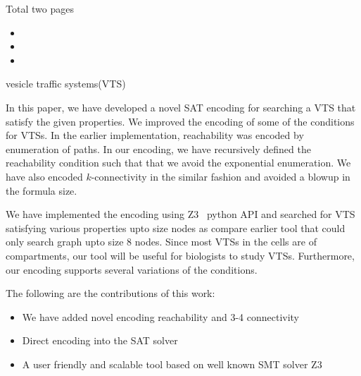 Total two pages

\begin{itemize}
\item {}

\item {}

\item {}

\end{itemize}




vesicle traffic systems(VTS)





%

In this paper, we have developed a novel SAT encoding for
searching a VTS that satisfy the given properties.
%
We improved the encoding of some of the conditions for VTSs.
%
In the earlier implementation, reachability was encoded by
enumeration of paths.
%
In our encoding, we have recursively defined the reachability condition
such that that we avoid the exponential enumeration.
%
We have also encoded $k$-connectivity in the similar fashion and
avoided a blowup in the formula size.
%

We have implemented the encoding using Z3~\cite{z3} python API and searched for
VTS satisfying various properties upto size  nodes as compare
earlier tool that could only search graph upto size 8 nodes.
%
Since most VTSs in the cells are of  compartments,
our tool will be useful for biologists to study VTSs.
%
Furthermore, our encoding supports several variations of
the conditions.

The following are the contributions of this work:
\begin{itemize}
\item We have added novel encoding reachability and 3-4 connectivity
\item Direct encoding into the SAT solver
\item A user friendly and scalable tool based on well known SMT solver Z3
\end{itemize}


